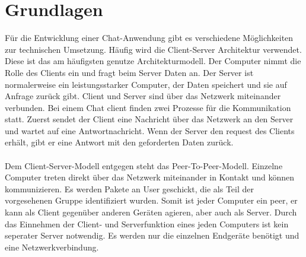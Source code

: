 \section{Grundlagen}
Für die Entwicklung einer Chat-Anwendung gibt es verschiedene Möglichkeiten zur technischen Umsetzung.
Häufig wird die Client-Server Architektur verwendet. Diese ist das am häufigsten genutze Architekturmodell. 
Der Computer nimmt die Rolle des Clients ein und fragt beim Server Daten an. 
Der Server ist normalerweise ein leistungsstarker Computer, der Daten speichert und sie auf Anfrage zurück gibt.
Client und Server sind über das Netzwerk miteinander verbunden. 
Bei einem Chat client finden zwei Prozesse für die Kommunikation statt.
Zuerst sendet der Client eine Nachricht über das Netzwerk an den Server und wartet auf eine Antwortnachricht. 
Wenn der Server den request des Clients erhält, gibt er eine Antwort mit den geforderten Daten zurück. 
\cite{tanenbaum96}
\\
\\
Dem Client-Server-Modell entgegen steht das Peer-To-Peer-Modell.
Einzelne Computer treten direkt über das Netzwerk miteinander in Kontakt und können kommunizieren.
Es werden Pakete an User geschickt, die als Teil der vorgesehenen Gruppe identifiziert wurden. 
Somit ist jeder Computer ein peer, er kann als Client gegenüber anderen Geräten agieren, aber auch als Server.
Durch das Einnehmen der Client- und Serverfunktion eines jeden Computers ist kein seperater Server notwendig.
Es werden nur die einzelnen Endgeräte benötigt und eine Netzwerkverbindung.
\cite{tanenbaum96}
